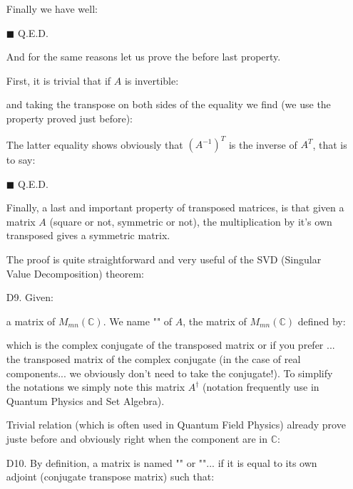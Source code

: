 \begin{enumerate}
\begin{dem}
		Finally we have well:
		
		\begin{flushright}
			$\blacksquare$  Q.E.D.
		\end{flushright}
		\end{dem}
		And for the same reasons let us prove the before last property.
		\begin{dem}
		First, it is trivial that if $A$ is invertible:
		
		and taking the transpose on both sides of the equality we find (we use the property proved just before):
		
		The latter equality shows obviously that $(A^{-1})^T$ is the inverse of $A^T$, that is to say:
		
		\begin{flushright}
			$\blacksquare$  Q.E.D.
		\end{flushright}
		\end{dem}
		Finally, a last and important property of transposed matrices, is that given a matrix $A$ (square or not, symmetric or not), the multiplication by it's own transposed gives a symmetric matrix. 
		
		The proof is quite straightforward and very useful of the SVD (Singular Value Decomposition) theorem:
		
		
		\item[D9.] Given:
		
		a matrix of $M_{mn}(\mathbb{C})$. We name "\label{adjoint matrix}" of $A$, the matrix of $M_{mn}(\mathbb{C})$ defined by:
		
		which is the complex conjugate of the transposed matrix or if you prefer ... the transposed matrix of the complex conjugate (in the case of real components... we obviously don't need to take the conjugate!). To simplify the notations we simply note this matrix $A^\dagger$ (notation frequently use in Quantum Physics and Set Algebra).
		\begin{tcolorbox}[title=Remark,colframe=black,arc=10pt]
		Trivial relation (which is often used in Quantum Field Physics) already prove juste before and obviously right when the component are in $\mathbb{C}$:
		
		\end{tcolorbox}
		
		\item[D10.] By definition, a matrix is named "" or "\label{self-ajdoint matrix}"... if it is equal to its own adjoint (conjugate transpose matrix) such that:
		

\end{enumerate}
